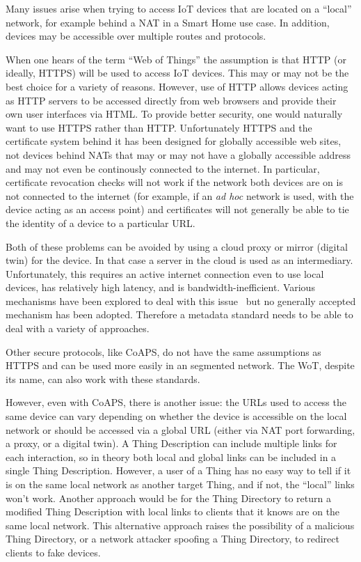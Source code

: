 Many issues arise when trying to access IoT devices
that are located on a ``local'' network,
for example behind a NAT in a Smart Home use case.
In addition, devices may be accessible over multiple
routes and protocols.

When one hears of the term ``Web of Things'' the
assumption is that HTTP (or ideally, HTTPS) will be used to
access IoT devices. This may or may not be the best choice
for a variety of reasons.  However, use of HTTP
allows devices acting as HTTP servers to be accessed directly
from web browsers and provide their own user
interfaces via HTML.  To provide better security, one would
naturally want to use HTTPS rather than HTTP.
Unfortunately HTTPS and the certificate system behind it has
been designed for globally accessible web sites, not devices
behind NATs that may or may not have a globally accessible
address and may not even be continously connected to the internet.
In particular, certificate revocation checks will not work if
the network both devices are on is not connected to the internet
(for example, if an \textit{ad hoc} network is used, with the device acting as
an access point) and certificates will not generally be able 
to tie the identity of a device to a particular URL. 

Both of these problems can be avoided by using a cloud proxy
or mirror (digital twin) for the device.
In that case a server
in the cloud is used as an intermediary.
Unfortunately,
this requires an active internet connection even to use 
local devices, has relatively high latency, and is
bandwidth-inefficient.
Various mechanisms have been explored to deal with this issue~\cite{httpslocal2017}
but no generally accepted mechanism has been adopted.
Therefore a metadata standard needs to be able to deal with a variety
of approaches.

Other secure protocols, like CoAPS, 
do not have the same assumptions as HTTPS and can be used
more easily in an segmented network.
The WoT, despite its name, can also work with these standards.

However, even with CoAPS, there is another issue: the URLs
used to access the same device can vary depending on whether the
device is accessible on the local network or should be accessed
via a global URL (either via NAT port forwarding, a proxy, or
a digital twin).
A Thing Description can include multiple links
for each interaction,
so in theory both local and global links
can be included in a single Thing Description.
However,
a user of a Thing has no easy way to tell if it is on
the same local network as another target Thing,
and if not, the ``local'' links won't work.
Another
approach would be for the Thing Directory to return a modified
Thing Description with local links to clients that it knows 
are on the same local network.
This alternative approach raises the possibility
of a malicious Thing Directory, or a network attacker spoofing a
Thing Directory, to redirect clients to fake devices.
